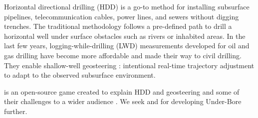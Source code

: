 Horizontal directional drilling (HDD) is a go-to method for installing subsurface pipelines, telecommunication cables, power lines, and sewers without digging trenches. 
The traditional methodology follows a pre-defined path to drill a horizontal well under surface obstacles such as rivers or inhabited areas. 
In the last few years, logging-while-drilling (LWD) measurements developed for oil and gas drilling have become more affordable and made their way to civil drilling. 
They enable shallow-well geosteering \cite{johnson2021using,ungemach2021real}: intentional real-time trajectory adjustment to adapt to the observed subsurface environment.

\cite{underbore2022}
is an open-source game created to explain HDD and geosteering and some of their challenges to a wider audience \cite{coding2022,practical2022}. 
We seek  and  for developing Under-Bore further.